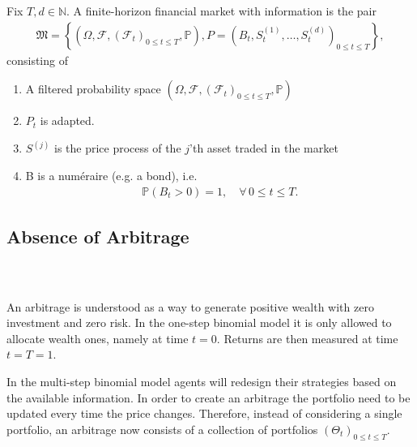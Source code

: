 \documentclass{beamer}
\numberwithin{equation}{section}
\begin{document}
\begin{frame}\frametitle{{\normalsize \secname} \\ {\large \subsecname}}
    \begin{definition}
        Fix $T, d \in \mathbb{N}$.
        A finite-horizon financial market with information is the pair
        \begin{align}
            \mathfrak{M} =
            \left\{
                \left(
                    \Omega, 
                    \mathscr{F}, 
                    \left(
                        \mathscr{F}_t
                    \right)_{0 \leq t \leq T},
                    \mathbb{P}
                \right),
                P =
                \left(
                    B_t,
                    S_t^{(1)},
                    \ldots,
                    S_t^{(d)}
                \right)_{0 \leq t \leq T}
            \right\},
        \end{align}
        consisting of
        \begin{enumerate}
            \item A filtered probability space 
            $\left(
                \Omega, 
                \mathscr{F}, 
                \left(
                    \mathscr{F}_t
                \right)_{0 \leq t \leq T},
                \mathbb{P}
            \right)$
            \item $P_t$ is adapted.
            \item $S^{(j)}$ is the price process of the $j$'th asset traded in the market
            \item B is a numéraire (e.g. a bond), i.e.
            \begin{align}
                \mathbb{P}(B_t > 0) = 1, \quad \forall \, 0 \leq t \leq T.
            \end{align}
        \end{enumerate}
    \end{definition}
\end{frame}

\subsection{Absence of Arbitrage}

\begin{frame}\frametitle{{\normalsize \secname} \\ {\large \subsecname}}
    An arbitrage is understood as a way to generate positive wealth with zero investment and zero risk.
    In the one-step binomial model it is only allowed to allocate wealth ones, namely at time $t = 0$.
    Returns are then measured at time $t = T = 1$.

    In the multi-step binomial model agents will redesign their strategies based on the available information.
    In order to create an arbitrage the portfolio need to be updated every time the price changes.
    Therefore, instead of considering a single portfolio, an arbitrage now consists of a collection of portfolios $\left(\Theta_t\right)_{0 \leq t \leq T}$.
\end{frame}
\end{document}
